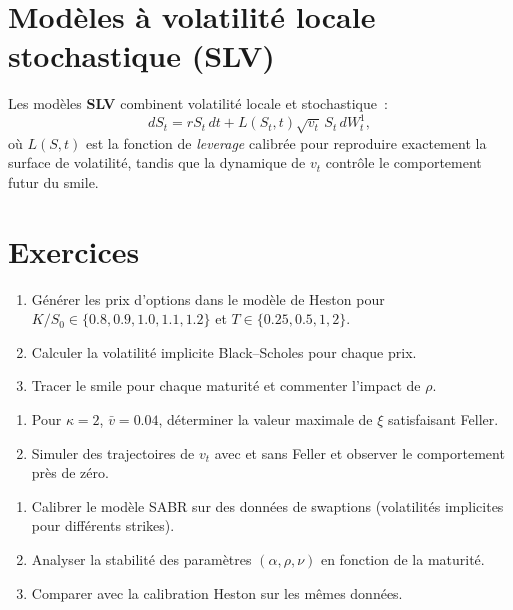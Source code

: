 \section{Mod\`eles \`a volatilit\'e locale stochastique (SLV)}

\begin{definition}
Les mod\`eles \textbf{SLV} combinent volatilit\'e locale et stochastique~:
\[
    dS_t = rS_t\,dt + L(S_t, t)\sqrt{v_t}\,S_t\,dW_t^1,
\]
o\`u $L(S,t)$ est la fonction de \textit{leverage} calibr\'ee pour
reproduire exactement la surface de volatilit\'e, tandis que la dynamique
de $v_t$ contr\^ole le comportement futur du smile.
\end{definition}

\section{Exercices}

\begin{exercice}
\begin{enumerate}
    \item G\'en\'erer les prix d'options dans le mod\`ele de Heston pour
          $K/S_0 \in \{0.8, 0.9, 1.0, 1.1, 1.2\}$ et $T \in \{0.25, 0.5, 1, 2\}$.
    \item Calculer la volatilit\'e implicite Black--Scholes pour chaque prix.
    \item Tracer le smile pour chaque maturit\'e et commenter l'impact de $\rho$.
\end{enumerate}
\end{exercice}

\begin{exercice}
\begin{enumerate}
    \item Pour $\kappa = 2$, $\bar{v} = 0.04$, d\'eterminer la valeur
          maximale de $\xi$ satisfaisant Feller.
    \item Simuler des trajectoires de $v_t$ avec et sans Feller et observer
          le comportement pr\`es de z\'ero.
\end{enumerate}
\end{exercice}

\begin{exercice}
\begin{enumerate}
    \item Calibrer le mod\`ele SABR sur des donn\'ees de swaptions
          (volatilit\'es implicites pour diff\'erents strikes).
    \item Analyser la stabilit\'e des param\`etres $(\alpha, \rho, \nu)$
          en fonction de la maturit\'e.
    \item Comparer avec la calibration Heston sur les m\^emes donn\'ees.
\end{enumerate}
\end{exercice}


